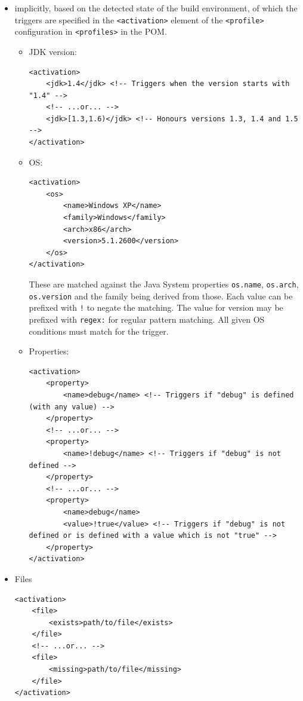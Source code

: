 \documentclass[table, xcdraw]{article}%
\begin{document}
\begin{itemize}
\begin{itemize}
        \begin{verbatim}
<profiles>
    <profile>
    <id>profileOne</id>
        <activation>
            <activeByDefault>true</activeByDefault>
        </activation>
    </profile>
</profiles>
        \end{verbatim}
        All profiles that are \texttt{activeByDefault} in the POM are automatically deactivated when a profile in the POM is activated on the command line or through its activation config.
    \end{itemize}
    \item implicitly, based on the detected state of the build environment, of which the triggers are specified in the \texttt{<activation>} element of the \texttt{<profile>} configuration in \texttt{<profiles>} in the POM.
    \begin{itemize}
        \item JDK version:
        \begin{verbatim}
<activation>
    <jdk>1.4</jdk> <!-- Triggers when the version starts with "1.4" -->
    <!-- ...or... -->
    <jdk>[1.3,1.6)</jdk> <!-- Honours versions 1.3, 1.4 and 1.5 -->
</activation>
        \end{verbatim}
        \item OS:
        \begin{verbatim}
<activation>
    <os>
        <name>Windows XP</name>
        <family>Windows</family>
        <arch>x86</arch>
        <version>5.1.2600</version>
    </os>
</activation>
        \end{verbatim}
        These are matched against the Java System properties \texttt{os.name}, \texttt{os.arch}, \texttt{os.version} and the family being derived from those. Each value can be prefixed with \texttt{!} to negate the matching. The value for version may be prefixed with \texttt{regex:} for regular pattern matching. All given OS conditions must match for the trigger.
        \item Properties:
        \begin{verbatim}
<activation>
    <property>
        <name>debug</name> <!-- Triggers if "debug" is defined (with any value) -->
    </property>
    <!-- ...or... -->
    <property>
        <name>!debug</name> <!-- Triggers if "debug" is not defined -->
    </property>
    <!-- ...or... -->
    <property>
        <name>debug</name>
        <value>!true</value> <!-- Triggers if "debug" is not defined or is defined with a value which is not "true" -->
    </property>
</activation>
        \end{verbatim}
    \end{itemize}
    \item Files
    \begin{verbatim}
<activation>
    <file>
        <exists>path/to/file</exists>
    </file>
    <!-- ...or... -->
    <file>
        <missing>path/to/file</missing>
    </file>
</activation>
    \end{verbatim}
\end{itemize}
\end{document}
